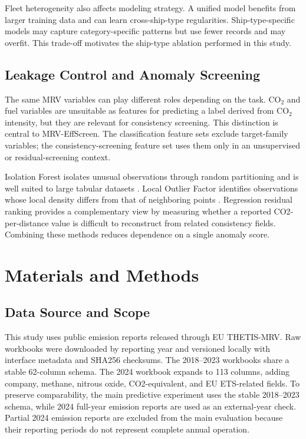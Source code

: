 \documentclass[jmse,article,submit,pdftex,oneauthor]{Definitions/mdpi}
\begin{document}
Fleet heterogeneity also affects modeling strategy. A unified model benefits from larger training data and can learn cross-ship-type regularities. Ship-type-specific models may capture category-specific patterns but use fewer records and may overfit. This trade-off motivates the ship-type ablation performed in this study.

\subsection{Leakage Control and Anomaly Screening}

The same MRV variables can play different roles depending on the task. CO$_2$ and fuel variables are unsuitable as features for predicting a label derived from CO$_2$ intensity, but they are relevant for consistency screening. This distinction is central to MRV-EffScreen. The classification feature sets exclude target-family variables; the consistency-screening feature set uses them only in an unsupervised or residual-screening context.

Isolation Forest isolates unusual observations through random partitioning and is well suited to large tabular datasets \cite{liu2008isolation_forest}. Local Outlier Factor identifies observations whose local density differs from that of neighboring points \cite{breunig2000lof}. Regression residual ranking provides a complementary view by measuring whether a reported CO2-per-distance value is difficult to reconstruct from related consistency fields. Combining these methods reduces dependence on a single anomaly score.

\section{Materials and Methods}

\subsection{Data Source and Scope}

This study uses public emission reports released through EU THETIS-MRV. Raw workbooks were downloaded by reporting year and versioned locally with interface metadata and SHA256 checksums. The 2018--2023 workbooks share a stable 62-column schema. The 2024 workbook expands to 113 columns, adding company, methane, nitrous oxide, CO2-equivalent, and EU ETS-related fields. To preserve comparability, the main predictive experiment uses the stable 2018--2023 schema, while 2024 full-year emission reports are used as an external-year check. Partial 2024 emission reports are excluded from the main evaluation because their reporting periods do not represent complete annual operation.
\end{document}
